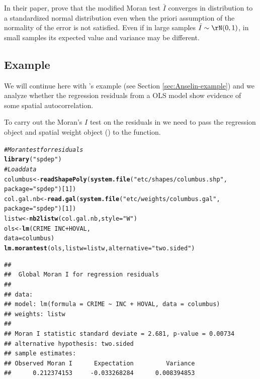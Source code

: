 \documentclass[english,12pt]{book}\usepackage[]{graphicx}\usepackage[]{xcolor}
\makeatletter
\newcommand{\hlnum}[1]{\textcolor[rgb]{0.686,0.059,0.569}{#1}}%
\newcommand{\hlstr}[1]{\textcolor[rgb]{0.192,0.494,0.8}{#1}}%
\newcommand{\hlcom}[1]{\textcolor[rgb]{0.678,0.584,0.686}{\textit{#1}}}%
\newcommand{\hlopt}[1]{\textcolor[rgb]{0,0,0}{#1}}%
\newcommand{\hlstd}[1]{\textcolor[rgb]{0.345,0.345,0.345}{#1}}%
\newcommand{\hlkwb}[1]{\textcolor[rgb]{0.69,0.353,0.396}{#1}}%
\newcommand{\hlkwc}[1]{\textcolor[rgb]{0.333,0.667,0.333}{#1}}%
\newcommand{\hlkwd}[1]{\textcolor[rgb]{0.737,0.353,0.396}{\textbf{#1}}}%
\newenvironment{kframe}{%
 \def\at@end@of@kframe{}%
 \ifinner\ifhmode%
  \def\at@end@of@kframe{\end{minipage}}%
  \begin{minipage}{\columnwidth}%
 \fi\fi%
 \def\FrameCommand##1{\hskip\@totalleftmargin \hskip-\fboxsep
 \colorbox{shadecolor}{##1}\hskip-\fboxsep
     \hskip-\linewidth \hskip-\@totalleftmargin \hskip\columnwidth}%
 \MakeFramed {\advance\hsize-\width
   \@totalleftmargin\z@ \linewidth\hsize
   \@setminipage}}%
 {\par\unskip\endMakeFramed%
 \at@end@of@kframe}
\newenvironment{knitrout}{}{} %
\makeatother
\begin{document}
In their paper,  \cite{kelejian2001asymptotic} prove that the modified Moran test $\bar{I}$ converges in distribution to a standardized normal distribution even when the priori assumption of the normality of the error is not satisfied. Even if in large samples $\bar{I}\sim \rN(0, 1)$, in small samples its expected value and variance may be different. 

\subsection{Example}

We will continue here with \cite{anselin1988spatial}'s example (see Section \ref{sec:Anselin-example}) and we analyze whether the regression residuals from a OLS model show evidence of some spatial autocorrelation. 

To carry out the Moran's $I$ test on the residuals in  we need to pass the regression object and spatial weight object () to the  function. 

\begin{knitrout}
\color{fgcolor}\begin{kframe}
\begin{alltt}
\hlcom{# Moran test for residuals}
\hlkwd{library}\hlstd{(}\hlstr{"spdep"}\hlstd{)}
\hlcom{# Load data}
\hlstd{columbus}   \hlkwb{<-} \hlkwd{readShapePoly}\hlstd{(}\hlkwd{system.file}\hlstd{(}\hlstr{"etc/shapes/columbus.shp"}\hlstd{,}
                                      \hlkwc{package} \hlstd{=} \hlstr{"spdep"}\hlstd{)[}\hlnum{1}\hlstd{])}
\hlstd{col.gal.nb} \hlkwb{<-} \hlkwd{read.gal}\hlstd{(}\hlkwd{system.file}\hlstd{(}\hlstr{"etc/weights/columbus.gal"}\hlstd{,}
                                   \hlkwc{package} \hlstd{=} \hlstr{"spdep"}\hlstd{)[}\hlnum{1}\hlstd{])}
\hlstd{listw} \hlkwb{<-} \hlkwd{nb2listw}\hlstd{(col.gal.nb,} \hlkwc{style} \hlstd{=} \hlstr{"W"}\hlstd{)}
\hlstd{ols} \hlkwb{<-} \hlkwd{lm}\hlstd{(CRIME} \hlopt{~} \hlstd{INC} \hlopt{+} \hlstd{HOVAL,}
          \hlkwc{data} \hlstd{=  columbus)}
\hlkwd{lm.morantest}\hlstd{(ols,} \hlkwc{listw} \hlstd{= listw,} \hlkwc{alternative} \hlstd{=} \hlstr{"two.sided"}\hlstd{)}
\end{alltt}
\begin{verbatim}
## 
## 	Global Moran I for regression residuals
## 
## data:  
## model: lm(formula = CRIME ~ INC + HOVAL, data = columbus)
## weights: listw
## 
## Moran I statistic standard deviate = 2.681, p-value = 0.00734
## alternative hypothesis: two.sided
## sample estimates:
## Observed Moran I      Expectation         Variance 
##      0.212374153     -0.033268284      0.008394853
\end{verbatim}
\end{kframe}
\end{knitrout}
\end{document}
